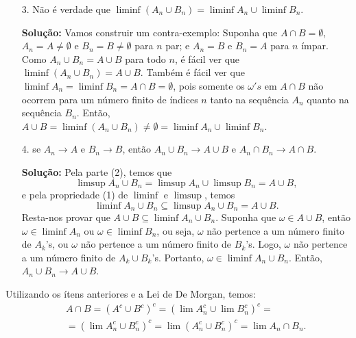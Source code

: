\begin{frame}
\begin{block}{}
\begin{itemize}
\item[3.] Não é verdade que $\liminf (A_n\cup B_n)=\liminf A_n\cup\liminf B_n.$ 

{\bf Solução:} Vamos construir um contra-exemplo: Suponha que $A\cap
B=\emptyset$, $A_n=A\ne \emptyset$ e $B_n=B\ne \emptyset$ para $n$
par; e $A_n=B$ e $B_n=A$ para $n$ ímpar. Como $A_n\cup B_n=A\cup B$
para todo $n$, é fácil ver que $\liminf (A_n\cup B_n)=A\cup B$.
Também é fácil ver que $\liminf A_n=\liminf B_n=A\cap B=\emptyset$,
pois somente os $\omega's$ em $A\cap B$ não ocorrem para um número
finito de índices $n$ tanto na sequência $A_n$ quanto na sequência
$B_n$. Então, $A\cup B=\liminf (A_n\cup B_n)\ne \emptyset=\liminf
A_n\cup\liminf B_n$.

\item[4.] se $A_n\rightarrow A$ e $B_n\rightarrow B$, então $A_n\cup B_n\rightarrow A\cup B$ e $A_n\cap B_n\rightarrow A\cap B$.

{\bf Solução:} Pela parte (2), temos que
%
$$\limsup A_n\cup B_n=\limsup A_n\cup\limsup B_n=A\cup B,$$
e pela propriedade (1) de $\liminf$ e $\limsup$, temos
$$\liminf A_n\cup B_n \subseteq \limsup A_n\cup B_n = A\cup B.$$
%
Resta-nos provar que $A\cup B \subseteq \liminf A_n\cup B_n$.
Suponha que $\omega\in A\cup B$, então $\omega\in \liminf A_n$ ou
$\omega\in \liminf B_n$, ou seja, $\omega$ não pertence a um número
finito de $A_k$'s, ou $\omega$ não pertence a um número finito de
$B_k$'s. Logo, $\omega$ não pertence a um número finito de $A_k\cup
B_k$'s. Portanto, $\omega\in\liminf A_n\cup B_n$. Então, $A_n\cup
B_n\rightarrow A\cup B$.


\end{itemize}
Utilizando os ítens anteriores e a Lei de De Morgan, temos:
\begin{eqnarray}
& & A\cap B= (A^c\cup B^c)^c= (\lim A_n^c\cup \lim B_n^c)^c=
\nonumber \\
& & =(\lim A_n^c\cup B_n^c)^c=\lim (A_n^c\cup B_n^c)^c= \lim A_n\cap
B_n. \nonumber
\end{eqnarray}


\end{block}
\end{frame}
%
